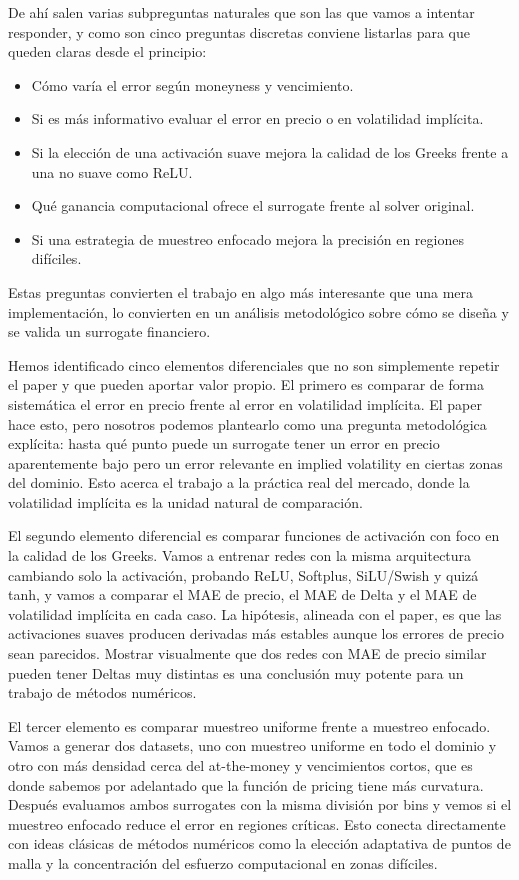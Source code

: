 \documentclass[11pt,a4paper]{article}
\begin{document}
De ahí salen varias subpreguntas naturales que son las que vamos a intentar responder, y como son cinco preguntas discretas conviene listarlas para que queden claras desde el principio:

\begin{itemize}
\item Cómo varía el error según moneyness y vencimiento.
\item Si es más informativo evaluar el error en precio o en volatilidad implícita.
\item Si la elección de una activación suave mejora la calidad de los Greeks frente a una no suave como ReLU.
\item Qué ganancia computacional ofrece el surrogate frente al solver original.
\item Si una estrategia de muestreo enfocado mejora la precisión en regiones difíciles.
\end{itemize}

Estas preguntas convierten el trabajo en algo más interesante que una mera implementación, lo convierten en un análisis metodológico sobre cómo se diseña y se valida un surrogate financiero.

Hemos identificado cinco elementos diferenciales que no son simplemente repetir el paper y que pueden aportar valor propio. El primero es comparar de forma sistemática el error en precio frente al error en volatilidad implícita. El paper hace esto, pero nosotros podemos plantearlo como una pregunta metodológica explícita: hasta qué punto puede un surrogate tener un error en precio aparentemente bajo pero un error relevante en implied volatility en ciertas zonas del dominio. Esto acerca el trabajo a la práctica real del mercado, donde la volatilidad implícita es la unidad natural de comparación.

El segundo elemento diferencial es comparar funciones de activación con foco en la calidad de los Greeks. Vamos a entrenar redes con la misma arquitectura cambiando solo la activación, probando ReLU, Softplus, SiLU/Swish y quizá tanh, y vamos a comparar el MAE de precio, el MAE de Delta y el MAE de volatilidad implícita en cada caso. La hipótesis, alineada con el paper, es que las activaciones suaves producen derivadas más estables aunque los errores de precio sean parecidos. Mostrar visualmente que dos redes con MAE de precio similar pueden tener Deltas muy distintas es una conclusión muy potente para un trabajo de métodos numéricos.

El tercer elemento es comparar muestreo uniforme frente a muestreo enfocado. Vamos a generar dos datasets, uno con muestreo uniforme en todo el dominio y otro con más densidad cerca del at-the-money y vencimientos cortos, que es donde sabemos por adelantado que la función de pricing tiene más curvatura. Después evaluamos ambos surrogates con la misma división por bins y vemos si el muestreo enfocado reduce el error en regiones críticas. Esto conecta directamente con ideas clásicas de métodos numéricos como la elección adaptativa de puntos de malla y la concentración del esfuerzo computacional en zonas difíciles.
\end{document}
